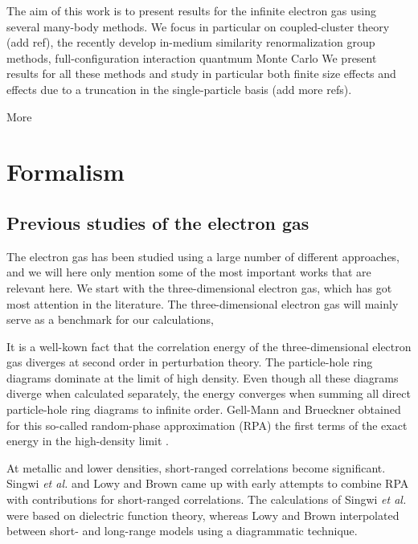 \documentclass[aps,twocolumn,showpacs,floatfix,nofootinbib,preprintnumbers,superscriptaddress,amsmath,amssymb]{revtex4-1}
\begin{document}
The aim of this work is to present results for the infinite electron
gas using several many-body methods.  We focus in particular on
coupled-cluster theory (add ref), the recently develop in-medium
similarity renormalization group methods, full-configuration
interaction quantmum Monte Carlo \cite{booth2009,shepherd2012a,booth2013}
We present results for all these methods and study in particular both finite size effects and effects due to
a truncation in the single-particle basis (add more refs). 

More 

\section{Formalism}
\label{sec:formalism}

\subsection{Previous studies of the electron gas}

The electron gas has been studied using a large number 
of different approaches, and we will here only mention
some of the most important works that are relevant here. 
We start with the three-dimensional electron 
gas, which has got most attention in the literature.
The three-dimensional electron gas will mainly serve as a benchmark for our calculations,

It is a well-kown fact that the correlation energy
of the three-dimensional electron gas diverges 
at second order in perturbation theory. The particle-hole ring diagrams 
dominate at the limit of high density. Even though
all these diagrams diverge when calculated separately,
the energy converges when summing all direct 
particle-hole ring diagrams to infinite order.
Gell-Mann and Brueckner obtained for this so-called
random-phase approximation (RPA) the first terms of
the exact energy in the high-density limit 
\cite{gellmann1957}. 


At metallic and lower densities, short-ranged correlations
become significant. Singwi \emph{et al.} \cite{singwi1968}
and Lowy and Brown \cite{lowy1975} came up with early attempts 
to combine RPA with contributions for short-ranged 
correlations. The calculations of Singwi \emph{et al.}
were based on dielectric function theory, whereas Lowy and
Brown interpolated between short- and long-range models
using a diagrammatic technique. 
\end{document}
